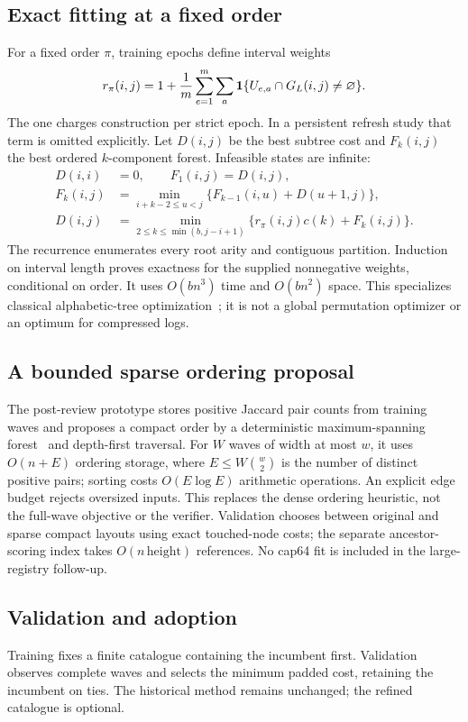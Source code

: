 \documentclass[10pt,journal,compsoc]{IEEEtran}
\theoremstyle{definition}\newtheorem{definition}[theorem]{Definition}
\begin{document}
\subsection{Exact fitting at a fixed order}
For a fixed order $\pi$, training epochs define interval weights
\begin{equation}\label{eq:jweights}
 r_\pi(i,j)=1+\frac1m\sum_{e=1}^m\sum_a
 \mathbf 1\{U_{e,a}\cap G_L(i,j)\ne\varnothing\}.
\end{equation}
The one charges construction per strict epoch. In a persistent refresh study
that term is omitted explicitly.
Let $D(i,j)$ be the best subtree cost and $F_k(i,j)$ the best ordered
$k$-component forest. Infeasible states are infinite:
\begin{align}
 D(i,i)&=0,\qquad F_1(i,j)=D(i,j),\nonumber\\
 F_k(i,j)&=\min_{i+k-2\le u<j}
       \{F_{k-1}(i,u)+D(u+1,j)\},\nonumber\\
 D(i,j)&=\min_{2\le k\le\min(b,j-i+1)}
       \{r_\pi(i,j)c(k)+F_k(i,j)\}.\label{eq:dp}
\end{align}
The recurrence enumerates every root arity and contiguous partition.
Induction on interval length proves exactness for the supplied nonnegative
weights, conditional on order. It uses $O(bn^3)$ time and $O(bn^2)$ space.
This specializes classical alphabetic-tree optimization~\cite{alphabetic};
it is not a global permutation optimizer or an optimum for compressed logs.


\subsection{A bounded sparse ordering proposal}\label{sec:sparse}
The post-review prototype stores positive Jaccard pair counts from training
waves and proposes a compact order by a deterministic maximum-spanning
forest~\cite{kruskal} and depth-first traversal. For $W$ waves of width at most $w$, it
uses $O(n+E)$ ordering storage, where $E\le W\binom w2$ is the number of
distinct positive pairs; sorting costs $O(E\log E)$ arithmetic operations.
An explicit edge budget rejects oversized inputs. This replaces the dense
ordering heuristic, not the full-wave objective or the verifier. Validation
chooses between original and sparse compact layouts using exact touched-node
costs; the separate ancestor-scoring index takes $O(n\,\mathrm{height})$
references. No cap64 fit is included in the large-registry follow-up.

\subsection{Validation and adoption}
Training fixes a finite catalogue containing the incumbent first.
Validation observes complete waves and selects the minimum padded cost,
retaining the incumbent on ties. The historical method remains unchanged;
the refined catalogue is optional.
\end{document}
